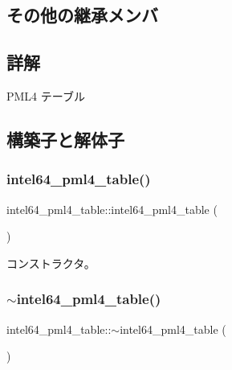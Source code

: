 \subsection*{その他の継承メンバ}


\subsection{詳解}
P\+M\+L4 テーブル 

\subsection{構築子と解体子}
\hypertarget{classintel64__pml4__table_a7adfe75831c29123302f378a061a076e}{}\label{classintel64__pml4__table_a7adfe75831c29123302f378a061a076e} 
\subsubsection{\texorpdfstring{intel64\+\_\+pml4\+\_\+table()}{intel64\_pml4\_table()}\hspace{0.1cm}{\footnotesize\ttfamily [1/3]}}
{\footnotesize\ttfamily intel64\+\_\+pml4\+\_\+table\+::intel64\+\_\+pml4\+\_\+table (\begin{DoxyParamCaption}{ }\end{DoxyParamCaption})}

コンストラクタ。 \hypertarget{classintel64__pml4__table_ab74e8b2b58fe884d3b9f1e9bd1342fbb}{}\label{classintel64__pml4__table_ab74e8b2b58fe884d3b9f1e9bd1342fbb} 
\subsubsection{\texorpdfstring{$\sim$intel64\+\_\+pml4\+\_\+table()}{~intel64\_pml4\_table()}}
{\footnotesize\ttfamily intel64\+\_\+pml4\+\_\+table\+::$\sim$intel64\+\_\+pml4\+\_\+table (\begin{DoxyParamCaption}{ }\end{DoxyParamCaption})\hspace{0.3cm}{\ttfamily [virtual]}}


